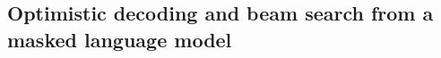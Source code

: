 \documentclass{article}
\newcommand{\cho}[1]{\textcolor{green}{KC: #1}}
\begin{document}




\subsection{Optimistic decoding and beam search from a masked language model}
\label{subsec:optimistic_decoding}
\end{document}
